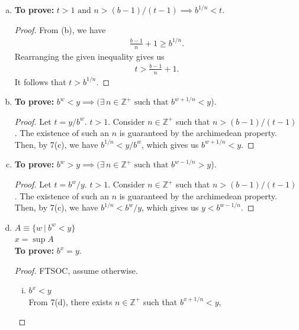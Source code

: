 \documentclass[12pt]{article}
\begin{document}
\begin{enumerate}[(a)]
      \item
            {\bf To prove:} $t>1\text{ and } n > (b-1)/(t-1) \implies b^{1/n} < t$.
            \begin{proof}
                  From (b), we have
                  \begin{align*}
                        \frac{b-1}n+1 \ge b^{1/n}.
                  \end{align*}
                  Rearranging the given inequality gives us
                  \begin{align*}
                        t > \frac{b-1}n+1.
                  \end{align*}
                  It follows that $t > b^{1/n}$.
            \end{proof}
      \item
            {\bf To prove:} $b^w < y \implies (\exists \,n \in \mathbb{Z}^+ \text{ such that } b^{w+1/n} < y$).
            \begin{proof}
                  Let $t = y/b^w$. $t>1$. Consider $n \in \mathbb{Z}^+$ such that $n > (b-1)/(t-1)$. The existence
                  of such an $n$ is guaranteed by the archimedean property. Then, by 7(c), we have
                  $b^{1/n} < y/b^w$, which gives us $b^{w + 1/n} < y$.
            \end{proof}
      \item
            {\bf To prove:} $b^w > y \implies (\exists \,n \in \mathbb{Z}^+ \text{ such that } b^{w-1/n} > y$).
            \begin{proof}
                  Let $t = b^w/y$. $t>1$. Consider $n \in \mathbb{Z}^+$ such that $n > (b-1)/(t-1)$. The existence
                  of such an $n$ is guaranteed by the archimedean property. Then, by 7(c), we have
                  $b^{1/n} < b^w/y$, which gives us $y < b^{w - 1/n}$.
            \end{proof}
      \item
            $A \equiv \{w\ |\ b^w<y\}$\\
            $x=\sup{A}$\\
            {\bf To prove:} $b^x = y$.
            \begin{proof}
                  FTSOC, assume otherwise.
                  \begin{enumerate}[(i)]
                        \item $b^x < y$\\
                              From 7(d), there exists $n \in \mathbb{Z}^+$ such that $b^{x+1/n} <y$,

\end{enumerate}
\end{proof}
\end{enumerate}
\end{document}

